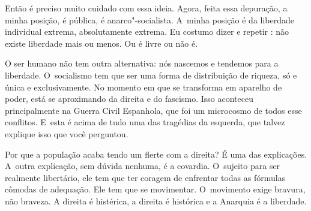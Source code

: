  

Então é preciso muito cuidado com essa ideia. Agora, feita essa
depuração, a minha posição, é pública, é anarco"-socialista. A~minha
posição é da liberdade individual extrema, absolutamente extrema. Eu
costumo dizer e repetir : não existe liberdade mais ou menos. Ou é
livre ou não é.

 

O ser humano não tem outra alternativa: nós nascemos e tendemos para a
liberdade. O~socialismo tem que ser uma forma de distribuição de
riqueza, só e única e exclusivamente. No momento em que se transforma em
aparelho de poder, está se aproximando da direita e do fascismo. Isso
aconteceu principalmente na Guerra Civil Espanhola, que foi um
microcosmo de todos esse conflitos. E~esta é acima de tudo uma das
tragédias da esquerda, que talvez explique isso que você perguntou.

Por que a população acaba tendo um flerte com a direita? É uma das
explicações. A~outra explicação, sem dúvida nenhuma, é a covardia. O~sujeito para ser realmente libertário, ele tem que ter coragem de
enfrentar todas as fórmulas cômodas de adequação. Ele tem que se
movimentar. O~movimento exige bravura, não braveza. A direita é histérica, a direita é 
histórica e a Anarquia é a liberdade. 


 

\fechafala 
